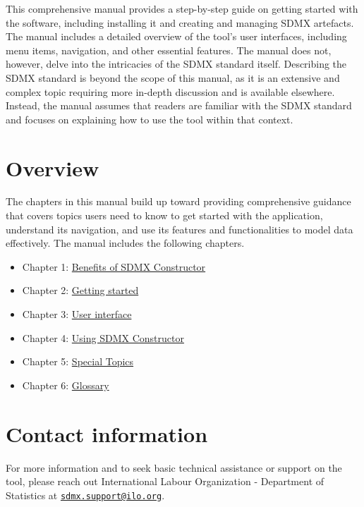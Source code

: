 \documentclass[
]{book}
\providecommand{\tightlist}{%
  \setlength{\itemsep}{0pt}\setlength{\parskip}{0pt}}
\begin{document}
This comprehensive manual provides a step-by-step guide on getting started with the software, including installing it and creating and managing SDMX artefacts. The manual includes a detailed overview of the tool's user interfaces, including menu items, navigation, and other essential features. The manual does not, however, delve into the intricacies of the SDMX standard itself. Describing the SDMX standard is beyond the scope of this manual, as it is an extensive and complex topic requiring more in-depth discussion and is available elsewhere. Instead, the manual assumes that readers are familiar with the SDMX standard and focuses on explaining how to use the tool within that context.

\hypertarget{overview}{%
\section*{Overview}\label{overview}}

The chapters in this manual build up toward providing comprehensive guidance that covers topics users need to know to get started with the application, understand its navigation, and use its features and functionalities to model data effectively. The manual includes the following chapters.

\begin{itemize}
\tightlist
\item
  Chapter 1: \protect\hyperlink{benefits-of}{Benefits of SDMX Constructor}
\item
  Chapter 2: \protect\hyperlink{getting-started}{Getting started}
\item
  Chapter 3: \protect\hyperlink{user-interface}{User interface}
\item
  Chapter 4: \protect\hyperlink{using-sdmx}{Using SDMX Constructor}
\item
  Chapter 5: \protect\hyperlink{special-topics}{Special Topics}
\item
  Chapter 6: \protect\hyperlink{glossary}{Glossary}
\end{itemize}

\hypertarget{contact-information}{%
\section*{Contact information}\label{contact-information}}

For more information and to seek basic technical assistance or support on the tool, please reach out International Labour Organization - Department of Statistics at \href{mailto:sdmx.support@ilo.org}{\nolinkurl{sdmx.support@ilo.org}}.
\end{document}
